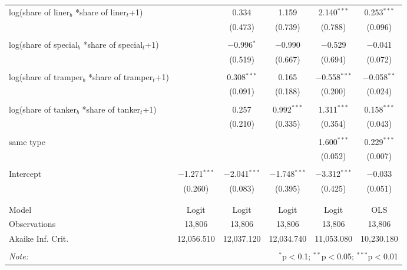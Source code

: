 \begin{tabular}{@{\extracolsep{5pt}}lccccc}
 log(share of liner$_{b}$ *share of liner$_{t}$+1) &  & 0.334 & 1.159 & 2.140$^{***}$ & 0.253$^{***}$ \\ 
  &  & (0.473) & (0.739) & (0.788) & (0.096) \\ 
  & & & & & \\ 
 log(share of special$_{b}$ *share of special$_{t}$+1) &  & $-$0.996$^{*}$ & $-$0.990 & $-$0.529 & $-$0.041 \\ 
  &  & (0.519) & (0.667) & (0.694) & (0.072) \\ 
  & & & & & \\ 
 log(share of tramper$_{b}$ *share of tramper$_{t}$+1) &  & 0.308$^{***}$ & 0.165 & $-$0.558$^{***}$ & $-$0.058$^{**}$ \\ 
  &  & (0.091) & (0.188) & (0.200) & (0.024) \\ 
  & & & & & \\ 
 log(share of tanker$_{b}$ *share of tanker$_{t}$+1) &  & 0.257 & 0.992$^{***}$ & 1.311$^{***}$ & 0.158$^{***}$ \\ 
  &  & (0.210) & (0.335) & (0.354) & (0.043) \\ 
  & & & & & \\ 
 same type &  &  &  & 1.600$^{***}$ & 0.229$^{***}$ \\ 
  &  &  &  & (0.052) & (0.007) \\ 
  & & & & & \\ 
 Intercept & $-$1.271$^{***}$ & $-$2.041$^{***}$ & $-$1.748$^{***}$ & $-$3.312$^{***}$ & $-$0.033 \\ 
  & (0.260) & (0.083) & (0.395) & (0.425) & (0.051) \\ 
  & & & & & \\ 
\hline \\[-1.8ex] 
Model & Logit & Logit & Logit & Logit & OLS \\ 
Observations & 13,806 & 13,806 & 13,806 & 13,806 & 13,806 \\ 
Akaike Inf. Crit. & 12,056.510 & 12,037.120 & 12,034.740 & 11,053.080 & 10,230.180 \\ 
\hline 
\hline \\[-1.8ex] 
\textit{Note:}  & \multicolumn{5}{r}{$^{*}$p$<$0.1; $^{**}$p$<$0.05; $^{***}$p$<$0.01} \\ 
\end{tabular} 
